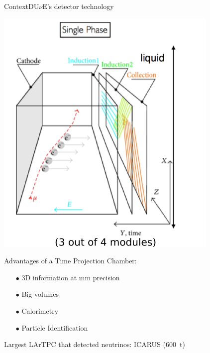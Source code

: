 \documentclass[10pt]{beamer}
\begin{document}
    \begin{frame}{Context}{DU$\nu$E's detector technology}
    	\begin{scriptsize}
    		\begin{minipage}{0.48\textwidth}
    			\includegraphics[width=\textwidth]{figures/contexte/lartpc.png}\\
    		\end{minipage}
    		\hfill
    		\begin{minipage}{0.48\textwidth}
    			Advantages of a Time Projection Chamber:    			
    			\begin{itemize}
    				\item[$\bullet$] 3D information at \si{\milli\meter} precision
    				\item[$\bullet$] Big volumes
    				\item[$\bullet$] Calorimetry
    				\item[$\bullet$] Particle Identification
    			\end{itemize}    			
    			Largest LArTPC that detected neutrinos: ICARUS (\SI{600}{\tonne})\\
    			

\end{minipage}
\end{scriptsize}
\end{frame}
\end{document}
